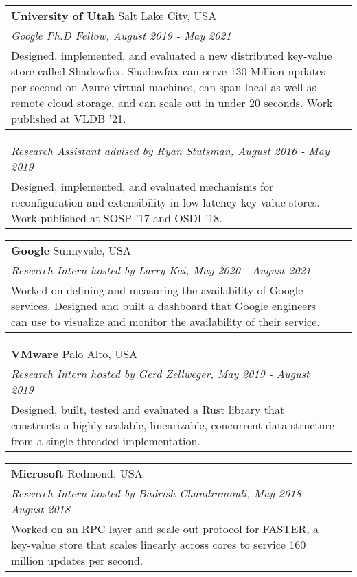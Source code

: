 \documentclass[margin,line]{res}
\begin{document}
\begin{resume}
\vspace{-7pt}
\begin{tabular}{@{}p{5.5in}p{4in}}
{\bf University of Utah} \dotfill Salt Lake City, USA \\
{\small\em Google Ph.D Fellow, August 2019 - May 2021} \\
{\small Designed, implemented, and evaluated a new distributed key-value
store called Shadowfax. Shadowfax can serve 130 Million updates per
second on Azure virtual machines, can span local as well as remote cloud
storage, and can scale out in under 20 seconds. Work published at
VLDB '21.}\\
\end{tabular}

\vspace{-7pt}
\begin{tabular}{@{}p{5.5in}p{4in}}
{\small\em Research Assistant advised by Ryan Stutsman, August 2016 - May 2019}\\
{\small Designed, implemented, and evaluated mechanisms for
reconfiguration and extensibility in low-latency key-value stores. Work
published at SOSP '17 and OSDI '18.}
\end{tabular}

\vspace{-7pt}
\begin{tabular}{@{}p{5.5in}p{4in}}
{\bf Google} \dotfill Sunnyvale, USA \\
{\small\em Research Intern hosted by Larry Kai, May 2020 - August 2021}\\
{\small Worked on defining and measuring the availability of Google
services. Designed and built a dashboard that Google engineers
can use to visualize and monitor the availability of their service.}
\end{tabular}

\vspace{-7pt}
\begin{tabular}{@{}p{5.5in}p{4in}}
{\bf VMware} \dotfill Palo Alto, USA \\
{\small\em Research Intern hosted by Gerd Zellweger, May 2019 - August 2019}\\
{\small
Designed,
built, tested and evaluated a Rust library that constructs a highly scalable, linearizable,
concurrent data
structure from a single threaded implementation.}
\end{tabular}

\vspace{-7pt}
\begin{tabular}{@{}p{5.5in}p{4in}}
{\bf Microsoft} \dotfill Redmond, USA \\
{\small\em Research Intern hosted by Badrish Chandramouli, May 2018 - August 2018}\\
{\small Worked on an RPC layer and scale out protocol for FASTER, a
key-value store that scales linearly across cores to service 160 million
updates per second.}
\end{tabular}


\end{resume}
\end{document}
